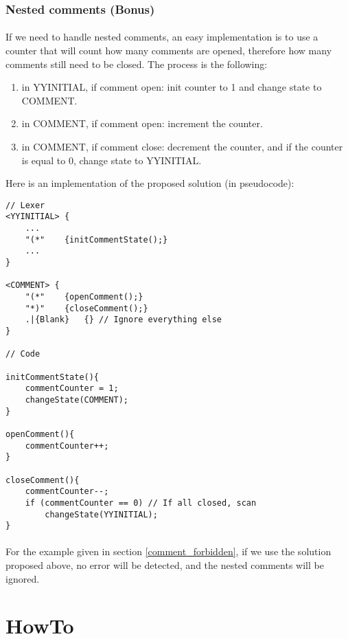 \documentclass[letterpaper]{article}
\begin{document}
\subsubsection{Nested comments (Bonus)}

\paragraph{}
If we need to handle nested comments, an easy implementation is to use a
counter that will count how many comments are opened, therefore how many
comments still need to be closed. The process is the following:
\begin{enumerate}
    \item in YYINITIAL, if comment open: init counter to 1 and change state
    to COMMENT.
    \item in COMMENT, if comment open: increment the counter.
    \item in COMMENT, if comment close: decrement the counter, and
    if the counter is equal to 0, change state to YYINITIAL.
\end{enumerate}

Here is an implementation of the proposed solution (in pseudocode): \\
\begin{lstlisting}[frame=single]
// Lexer
<YYINITIAL> {
    ...
    "(*"    {initCommentState();}
    ...
}

<COMMENT> {
    "(*"    {openComment();}
    "*)"    {closeComment();}
    .|{Blank}   {} // Ignore everything else
}

// Code

initCommentState(){
    commentCounter = 1;
    changeState(COMMENT);
}

openComment(){
    commentCounter++;
}

closeComment(){
    commentCounter--;
    if (commentCounter == 0) // If all closed, scan
        changeState(YYINITIAL);
}

\end{lstlisting}

\paragraph{}
For the example given in section \ref{comment_forbidden}, if we use the
solution proposed above, no error will be detected, and the nested
comments will be ignored.

\section{HowTo}
\end{document}
